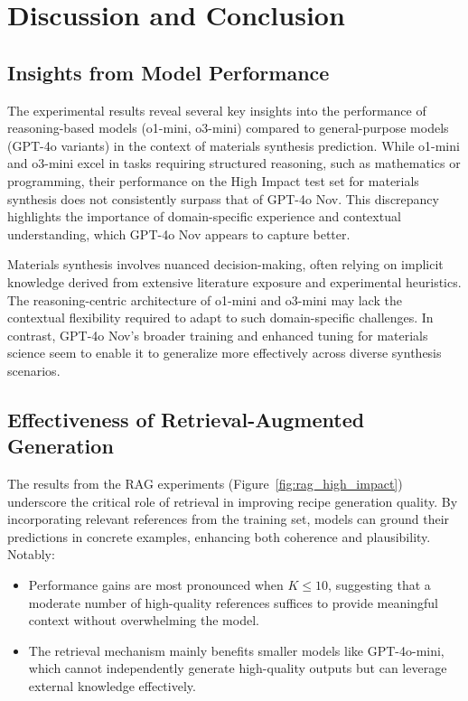 \section{Discussion and Conclusion}
\label{sec:conclusion}

\subsection{Insights from Model Performance}
The experimental results reveal several key insights into the performance of reasoning-based models (o1-mini, o3-mini) compared to general-purpose models (GPT-4o variants) in the context of materials synthesis prediction. While o1-mini and o3-mini excel in tasks requiring structured reasoning, such as mathematics or programming, their performance on the High Impact test set for materials synthesis does not consistently surpass that of GPT-4o Nov. This discrepancy highlights the importance of domain-specific experience and contextual understanding, which GPT-4o Nov appears to capture better.

Materials synthesis involves nuanced decision-making, often relying on implicit knowledge derived from extensive literature exposure and experimental heuristics. The reasoning-centric architecture of o1-mini and o3-mini may lack the contextual flexibility required to adapt to such domain-specific challenges. In contrast, GPT-4o Nov's broader training and enhanced tuning for materials science seem to enable it to generalize more effectively across diverse synthesis scenarios.

\subsection{Effectiveness of Retrieval-Augmented Generation}
The results from the RAG experiments (Figure~\ref{fig:rag_high_impact}) underscore the critical role of retrieval in improving recipe generation quality. By incorporating relevant references from the training set, models can ground their predictions in concrete examples, enhancing both coherence and plausibility. Notably:
\begin{itemize}
    \item Performance gains are most pronounced when \(K \leq 10\), suggesting that a moderate number of high-quality references suffices to provide meaningful context without overwhelming the model.
    \item The retrieval mechanism mainly benefits smaller models like GPT-4o-mini, which cannot independently generate high-quality outputs but can leverage external knowledge effectively.
\end{itemize}

